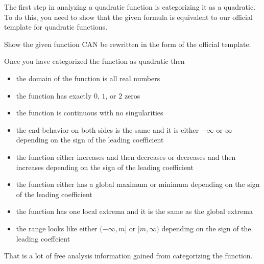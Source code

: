 \documentclass{ximera}
\begin{document}
The first step in analyzing a quadratic function is categorizing it as a quadratic.  To do this, you need to show that the given formula is equivalent to our official template for quadratic functions.

Show the given function CAN be rewritten in the form of the official template.


Once you have categorized the function as quadratic then

\begin{itemize}
\item the domain of the function is all real numbers
\item the function has exactly $0$, $1$, or $2$ zeros
\item the function is continuous with no singularities
\item the end-behavior on both sides is the same and it is either $-\infty$ or $\infty$ depending on the sign of the leading coefficient
\item the function either increases and then decreases or decreases and then increases depending on the sign of the leading coefficient
\item the function either has a global maximum or minimum depending on the sign of the leading coefficient
\item the function has one local extrema and it is the same as the global extrema
\item the range looks like either $(-\infty, m]$ or $[m, \infty)$ depending on the sign of the leading coeffcient
\end{itemize}



That is a lot of free analysis information gained from categorizing the function.
\end{document}
